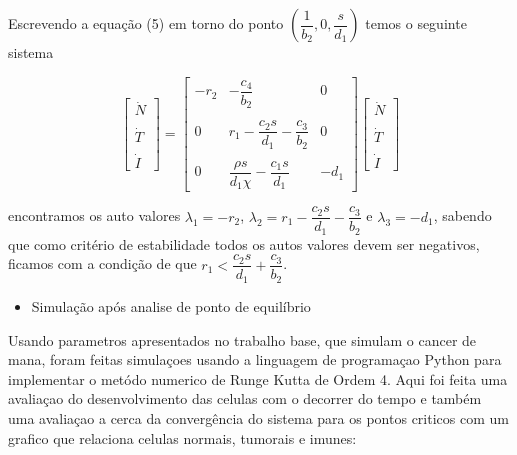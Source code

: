 \documentclass[12pt, a4paper]{article}
\begin{document}
Escrevendo a equação (5) em torno do ponto $(\dfrac{1}{b_2}, 0, \dfrac{s}{d_1})$ temos o seguinte sistema

$$
\left[ 
\begin{array}{c}
\dot{N} \\ \\
\dot{T} \\ \\
\dot{I}
\end{array}  
\right]
=
\left[ 
\begin{array}{ccc}
-r_2 & -\dfrac{c_4}{b_2} & 0 \\ \\
0 & r_1 - \dfrac{c_2 s}{d_1} - \dfrac{c_3}{b_2} & 0 \\ \\
0 & \dfrac{\rho s}{d_1 \chi} - \dfrac{c_1 s}{d_1} & -d_1 
\end{array}  
\right]
\left[ 
\begin{array}{c}
\dot{N} \\ \\
\dot{T} \\ \\
\dot{I}
\end{array}  
\right]
$$

encontramos os auto valores $\lambda_1 = -r_2$, $\lambda_2 = r_1 - \dfrac{c_2 s}{d_1} - \dfrac{c_3}{b_2}$ e $\lambda_3 = -d_1$, sabendo que como critério de estabilidade todos os autos valores devem ser negativos, ficamos com a condição de que $r_1 < \dfrac{c_2 s}{d_1} + \dfrac{c_3}{b_2}$.

\begin{itemize}
\item Simulação após analise de ponto de equilíbrio
\end{itemize}

Usando parametros apresentados no trabalho base, que simulam o cancer de mana, foram feitas simulaçoes usando a linguagem de programaçao Python para implementar o metódo numerico de Runge Kutta de Ordem 4. Aqui foi feita uma avaliaçao do desenvolvimento das celulas com o decorrer do tempo e também uma avaliaçao a cerca da convergência do sistema para os pontos criticos com um grafico que relaciona celulas normais, tumorais e imunes:

\newpage
\end{document}
